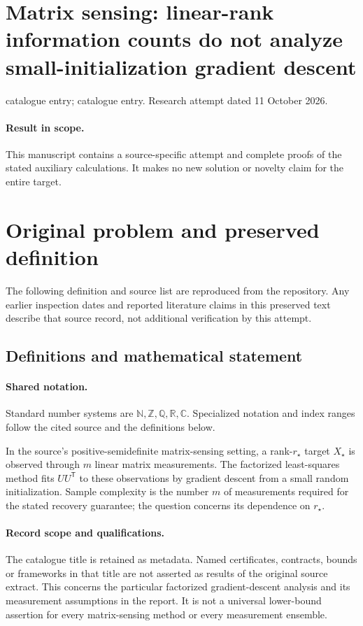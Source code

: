 \documentclass[11pt]{article}
\begin{document}
\section*{Matrix sensing: linear-rank information counts do not analyze small-initialization gradient descent}
\noindent catalogue entry; catalogue entry. Research attempt dated 11 October 2026.
\paragraph{Result in scope.}This manuscript contains a source-specific attempt and complete proofs of the stated auxiliary calculations. It makes no new solution or novelty claim for the entire target.
\section{Original problem and preserved definition}
The following definition and source list are reproduced from the repository. Any earlier inspection dates and reported literature claims in this preserved text describe that source record, not additional verification by this attempt.
\subsection{Definitions and mathematical statement}

\paragraph{Shared notation.}Standard number systems are $\mathbb N,\mathbb Z,\mathbb Q,\mathbb R,\mathbb C$. Specialized notation and index ranges follow the cited source and the definitions below.


In the source's positive-semidefinite matrix-sensing setting, a rank-$r_\star$ target $X_\star$ is observed through $m$ linear matrix measurements. The factorized least-squares method fits $UU^{\mathsf T}$ to these observations by gradient descent from a small random initialization. Sample complexity is the number $m$ of measurements required for the stated recovery guarantee; the question concerns its dependence on $r_\star$.
\paragraph{Record scope and qualifications.}
The catalogue title is retained as metadata. Named certificates, contracts, bounds or frameworks in that title are not asserted as results of the original source extract.
This concerns the particular factorized gradient-descent analysis and its measurement assumptions in the report. It is not a universal lower-bound assertion for every matrix-sensing method or every measurement ensemble.
\end{document}
